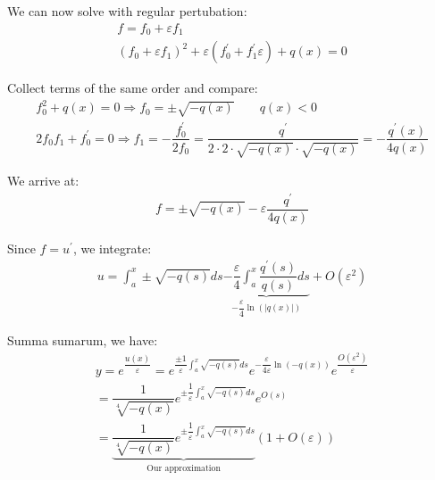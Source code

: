 \par\bigskip
\noindent We can now solve with regular pertubation:
\begin{equation*}
  \begin{gathered}
    f = f_0+\varepsilon f_1\\
    (f_0+\varepsilon f_1)^2+\varepsilon(f_0^{\prime}+f_1^{\prime}\varepsilon) +q(x)=0
  \end{gathered}
\end{equation*}\par
\noindent Collect terms of the same order and compare:
\begin{equation*}
  \begin{gathered}
    f_0^2+q(x) = 0\Rightarrow f_0 = \pm\sqrt{-q(x)}\qquad q(x)<0\\
    2f_0f_1+f_0^{\prime} = 0\Rightarrow f_1 = -\dfrac{f_0^{\prime}}{2f_0} = \dfrac{q^{\prime}}{2\cdot2\cdot\sqrt{-q(x)}\cdot\sqrt{-q(x)}} = -\dfrac{q^{\prime}(x)}{4q(x)}
  \end{gathered}
\end{equation*}\par
\noindent We arrive at:
\begin{equation*}
  \begin{gathered}
    f = \pm\sqrt{-q(x)} -\varepsilon\dfrac{q^{\prime}}{4q(x)}
  \end{gathered}
\end{equation*}\par
\noindent Since $f = u^{\prime}$, we integrate:
\begin{equation*}
  \begin{gathered}
    u = \int_{a}^{x}\pm\sqrt{-q(s)}ds \underbrace{-\dfrac{\varepsilon}{4}\int_{a}^{x}\dfrac{q^{\prime}(s)}{q(s)}ds}_{-\dfrac{\varepsilon}{4}\ln{\left(\left|q(x)\right|\right)}} + O(\varepsilon^2)
  \end{gathered}
\end{equation*}\par
\noindent Summa sumarum, we have:
\begin{equation*}
  \begin{gathered}
    y = e^{\dfrac{u(x)}{\varepsilon}}  = e^{\dfrac{\pm1}{\varepsilon}\int_{a}^{x}\sqrt{-q(s)}ds}e^{-\dfrac{\varepsilon}{4\varepsilon}\ln{\left(-q(x)\right)}}e^{\dfrac{O(\varepsilon^2)}{\varepsilon}}\\
    = \dfrac{1}{\sqrt[4]{-q(x)}}e^{\pm\dfrac{1}{\varepsilon}\int_{a}^{x}\sqrt{-q(s)}ds}e^{O(s)}\\
    = \underbrace{\dfrac{1}{\sqrt[4]{-q(x)}}e^{\pm\dfrac{1}{\varepsilon}\int_{a}^{x}\sqrt{-q(s)}ds}}_{\text{Our approximation}}(1+O(\varepsilon))
  \end{gathered}
\end{equation*}
